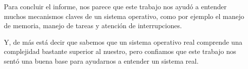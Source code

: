 \par Para concluir el informe, nos parece que este trabajo nos ayud\'o a entender muchos mecanismos claves de un sistema operativo, como por ejemplo el manejo de memoria, manejo de tareas y atenci\'on de interrupciones.
\par Y, de m\'as est\'a decir que sabemos que un sistema operativo real comprende una complejidad bastante superior al nuestro, pero confiamos que este trabajo nos sent\'o una buena base para ayudarnos a entender un sistema real.